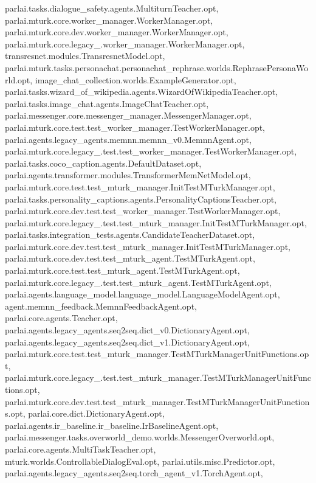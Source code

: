 parlai.\+tasks.\+dialogue\+\_\+safety.\+agents.\+Multiturn\+Teacher.\+opt, parlai.\+mturk.\+core.\+worker\+\_\+manager.\+Worker\+Manager.\+opt, parlai.\+mturk.\+core.\+dev.\+worker\+\_\+manager.\+Worker\+Manager.\+opt, parlai.\+mturk.\+core.\+legacy\+\_.\+worker\+\_\+manager.\+Worker\+Manager.\+opt, transresnet.\+modules.\+Transresnet\+Model.\+opt, parlai.\+mturk.\+tasks.\+personachat.\+personachat\+\_\+rephrase.\+worlds.\+Rephrase\+Persona\+World.\+opt, image\+\_\+chat\+\_\+collection.\+worlds.\+Example\+Generator.\+opt, parlai.\+tasks.\+wizard\+\_\+of\+\_\+wikipedia.\+agents.\+Wizard\+Of\+Wikipedia\+Teacher.\+opt, parlai.\+tasks.\+image\+\_\+chat.\+agents.\+Image\+Chat\+Teacher.\+opt, parlai.\+messenger.\+core.\+messenger\+\_\+manager.\+Messenger\+Manager.\+opt, parlai.\+mturk.\+core.\+test.\+test\+\_\+worker\+\_\+manager.\+Test\+Worker\+Manager.\+opt, parlai.\+agents.\+legacy\+\_\+agents.\+memnn.\+memnn\+\_\+v0.\+Memnn\+Agent.\+opt, parlai.\+mturk.\+core.\+legacy\+\_.\+test.\+test\+\_\+worker\+\_\+manager.\+Test\+Worker\+Manager.\+opt, parlai.\+tasks.\+coco\+\_\+caption.\+agents.\+Default\+Dataset.\+opt, parlai.\+agents.\+transformer.\+modules.\+Transformer\+Mem\+Net\+Model.\+opt, parlai.\+mturk.\+core.\+test.\+test\+\_\+mturk\+\_\+manager.\+Init\+Test\+M\+Turk\+Manager.\+opt, parlai.\+tasks.\+personality\+\_\+captions.\+agents.\+Personality\+Captions\+Teacher.\+opt, parlai.\+mturk.\+core.\+dev.\+test.\+test\+\_\+worker\+\_\+manager.\+Test\+Worker\+Manager.\+opt, parlai.\+mturk.\+core.\+legacy\+\_.\+test.\+test\+\_\+mturk\+\_\+manager.\+Init\+Test\+M\+Turk\+Manager.\+opt, parlai.\+tasks.\+integration\+\_\+tests.\+agents.\+Candidate\+Teacher\+Dataset.\+opt, parlai.\+mturk.\+core.\+dev.\+test.\+test\+\_\+mturk\+\_\+manager.\+Init\+Test\+M\+Turk\+Manager.\+opt, parlai.\+mturk.\+core.\+dev.\+test.\+test\+\_\+mturk\+\_\+agent.\+Test\+M\+Turk\+Agent.\+opt, parlai.\+mturk.\+core.\+test.\+test\+\_\+mturk\+\_\+agent.\+Test\+M\+Turk\+Agent.\+opt, parlai.\+mturk.\+core.\+legacy\+\_.\+test.\+test\+\_\+mturk\+\_\+agent.\+Test\+M\+Turk\+Agent.\+opt, parlai.\+agents.\+language\+\_\+model.\+language\+\_\+model.\+Language\+Model\+Agent.\+opt, agent.\+memnn\+\_\+feedback.\+Memnn\+Feedback\+Agent.\+opt, parlai.\+core.\+agents.\+Teacher.\+opt, parlai.\+agents.\+legacy\+\_\+agents.\+seq2seq.\+dict\+\_\+v0.\+Dictionary\+Agent.\+opt, parlai.\+agents.\+legacy\+\_\+agents.\+seq2seq.\+dict\+\_\+v1.\+Dictionary\+Agent.\+opt, parlai.\+mturk.\+core.\+test.\+test\+\_\+mturk\+\_\+manager.\+Test\+M\+Turk\+Manager\+Unit\+Functions.\+opt, parlai.\+mturk.\+core.\+legacy\+\_.\+test.\+test\+\_\+mturk\+\_\+manager.\+Test\+M\+Turk\+Manager\+Unit\+Functions.\+opt, parlai.\+mturk.\+core.\+dev.\+test.\+test\+\_\+mturk\+\_\+manager.\+Test\+M\+Turk\+Manager\+Unit\+Functions.\+opt, parlai.\+core.\+dict.\+Dictionary\+Agent.\+opt, parlai.\+agents.\+ir\+\_\+baseline.\+ir\+\_\+baseline.\+Ir\+Baseline\+Agent.\+opt, parlai.\+messenger.\+tasks.\+overworld\+\_\+demo.\+worlds.\+Messenger\+Overworld.\+opt, parlai.\+core.\+agents.\+Multi\+Task\+Teacher.\+opt, mturk.\+worlds.\+Controllable\+Dialog\+Eval.\+opt, parlai.\+utils.\+misc.\+Predictor.\+opt, parlai.\+agents.\+legacy\+\_\+agents.\+seq2seq.\+torch\+\_\+agent\+\_\+v1.\+Torch\+Agent.\+opt, 